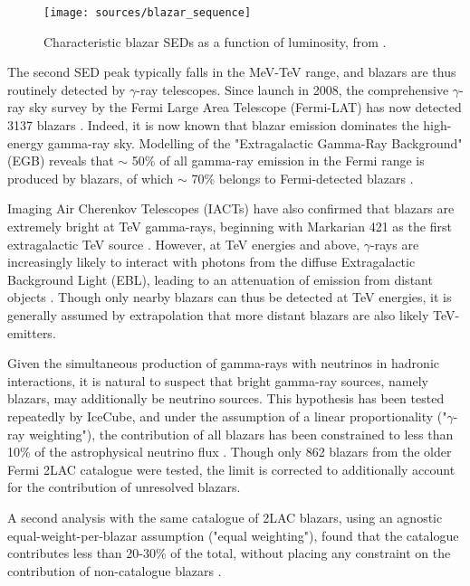 \begin{figure}[!ht]
	\centering \texttt{[image: sources/blazar\_sequence]}
	\caption{Characteristic blazar SEDs as a function of luminosity, from \cite{16_blazar_sequence}.}
	\label{fig:blazar_sequence}
\end{figure}

The second SED peak typically falls in the MeV-TeV range, and blazars are thus routinely detected by $\gamma$-ray telescopes. Since launch in 2008, the comprehensive $\gamma$-ray sky survey by the Fermi Large Area Telescope (Fermi-LAT) has now detected 3137 blazars . Indeed, it is now known that blazar emission dominates the high-energy gamma-ray sky. Modelling of the "Extragalactic Gamma-Ray Background" (EGB) reveals that $\sim$ 50\% of all gamma-ray emission in the Fermi range is produced by blazars, of which $\sim$ 70\% belongs to Fermi-detected blazars .  

Imaging Air Cherenkov Telescopes (IACTs) have also confirmed that blazars are extremely bright at TeV gamma-rays, beginning with Markarian 421 as the first extragalactic TeV source . However, at TeV energies and above, $\gamma$-rays are increasingly likely to interact with photons from the diffuse Extragalactic Background Light (EBL), leading to an attenuation of emission from distant objects . Though only nearby blazars can thus be detected at TeV energies, it is generally assumed by extrapolation that more distant blazars are also likely TeV-emitters.

 Given the simultaneous production of gamma-rays with neutrinos in hadronic interactions, it is natural to suspect that bright gamma-ray sources, namely blazars, may additionally be neutrino sources. This hypothesis has been tested repeatedly by IceCube, and under the assumption of a linear proportionality ("$\gamma$-ray weighting"), the contribution of all blazars has been constrained to less than 10\% of the astrophysical neutrino flux . Though only 862 blazars from the older Fermi 2LAC catalogue were tested, the limit is corrected to additionally account for the contribution of unresolved blazars. 
 
 A second analysis with the same catalogue of 2LAC blazars, using an agnostic equal-weight-per-blazar assumption ("equal weighting"), found that the catalogue contributes less than 20-30\% of the total, without placing any constraint on the contribution of non-catalogue blazars \cite{ic_blazar_17}. 
 
